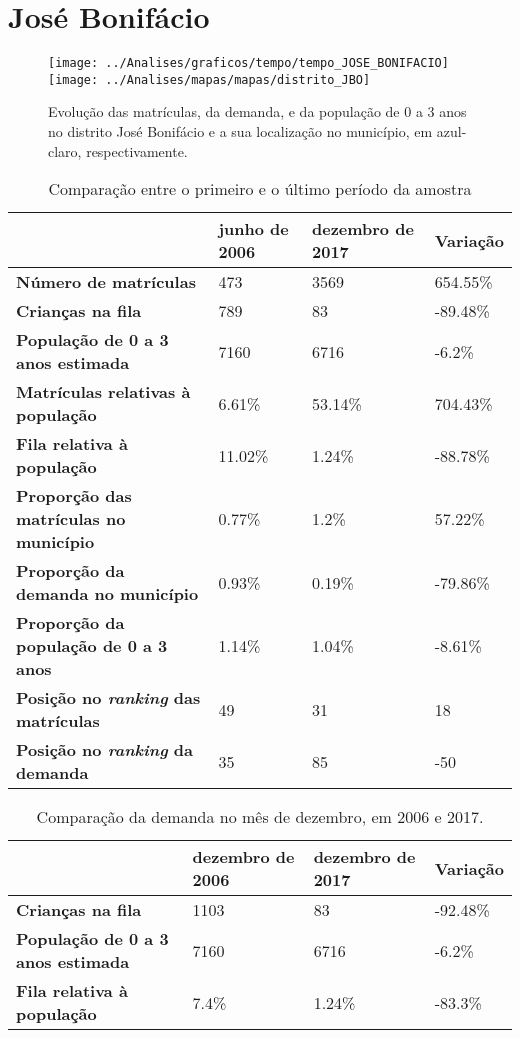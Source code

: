 \section{José Bonifácio}
\begin{figure}[H]
\centering
\texttt{[image: ../Analises/graficos/tempo/tempo\_JOSE\_BONIFACIO]}
\texttt{[image: ../Analises/mapas/mapas/distrito\_JBO]}
\caption{Evolução das matrículas, da demanda, e da população de 0 a 3 anos no distrito José Bonifácio e a sua localização no município, em azul-claro, respectivamente.}
\end{figure}
\begin{table}[H]
\begin{tabular}{l|l|l|l}
\textbf{}                                      & \textbf{junho de 2006}       & \textbf{dezembro de 2017}    & \textbf{Variação} \\ \hline
\textbf{Número de matrículas}                  & 473 & 3569 & 654.55\% \\ \hline
\textbf{Crianças na fila}                      & 789 & 83 & -89.48\% \\ \hline
\textbf{População de 0 a 3 anos estimada}      & 7160 & 6716 & -6.2\% \\ \hline
\textbf{Matrículas relativas à população}      & 6.61\% & 53.14\% & 704.43\% \\ \hline
\textbf{Fila relativa à população}             & 11.02\% & 1.24\% & -88.78\% \\ \hline
\textbf{Proporção das matrículas no município} & 0.77\% & 1.2\% & 57.22\% \\ \hline
\textbf{Proporção da demanda no município}     & 0.93\% & 0.19\% & -79.86\% \\ \hline
\textbf{Proporção da população de 0 a 3 anos}  & 1.14\% & 1.04\% & -8.61\% \\ \hline
\textbf{Posição no \textit{ranking} das matrículas}     & 49 & 31 & 18 \\ \hline
\textbf{Posição no \textit{ranking} da demanda}         & 35 & 85 & -50 \\ 
\end{tabular}
\caption{Comparação entre o primeiro e o último período da amostra}
\end{table}
\begin{table}[H]
\begin{tabular}{l|l|l|l}
\textbf{}                                 & \textbf{dezembro de 2006} & \textbf{dezembro de 2017} & \textbf{Variação} \\ \hline
\textbf{Crianças na fila}                      & 1103 & 83 & -92.48\% \\ \hline
\textbf{População de 0 a 3 anos estimada}      & 7160 & 6716 & -6.2\% \\ \hline
\textbf{Fila relativa à população}             & 7.4\% & 1.24\% & -83.3\% \\
\end{tabular}
\caption{Comparação da demanda no mês de dezembro, em 2006 e 2017.}
\end{table}
